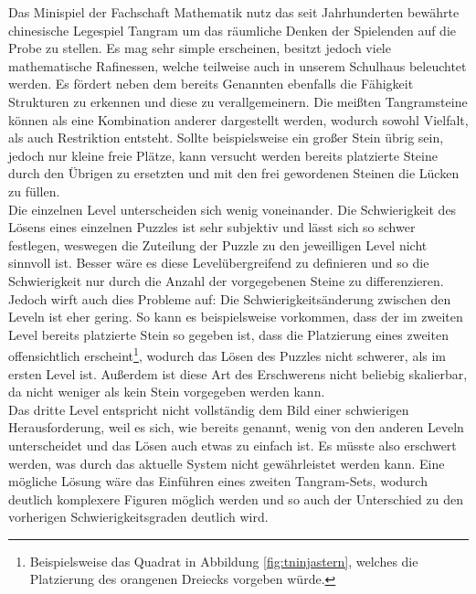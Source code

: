 Das Minispiel der Fachschaft Mathematik nutz das seit Jahrhunderten bewährte chinesische Legespiel \glqq Tangram\grqq{} um das räumliche Denken der Spielenden auf die Probe zu stellen.
Es mag sehr simple erscheinen, besitzt jedoch viele mathematische Rafinessen, welche teilweise auch in unserem Schulhaus beleuchtet werden. 
Es fördert neben dem bereits Genannten ebenfalls die Fähigkeit Strukturen zu erkennen und diese zu verallgemeinern.
Die meißten Tangramsteine können als eine Kombination anderer dargestellt werden, wodurch sowohl Vielfalt, als auch Restriktion entsteht.
Sollte beispielsweise ein großer Stein übrig sein, jedoch nur kleine freie Plätze, kann versucht werden bereits platzierte Steine durch den Übrigen zu ersetzten und mit den frei gewordenen Steinen die Lücken zu füllen.\\
Die einzelnen Level unterscheiden sich wenig voneinander.
Die Schwierigkeit des Lösens eines einzelnen Puzzles ist sehr subjektiv und lässt sich so schwer festlegen, weswegen die Zuteilung der Puzzle zu den jeweilligen Level nicht sinnvoll ist.
Besser wäre es diese Levelübergreifend zu definieren und so die Schwierigkeit nur durch die Anzahl der vorgegebenen Steine zu differenzieren.
Jedoch wirft auch dies Probleme auf:
Die Schwierigkeitsänderung zwischen den Leveln ist eher gering.
So kann es beispielsweise vorkommen, dass der im zweiten Level bereits platzierte Stein so gegeben ist, dass die Platzierung eines zweiten offensichtlich erscheint\footnote{Beispielsweise das Quadrat in Abbildung \ref{fig:tninjastern}, welches die Platzierung des orangenen Dreiecks vorgeben würde.}, wodurch das Lösen des Puzzles nicht schwerer, als im ersten Level ist.
Außerdem ist diese Art des Erschwerens nicht beliebig skalierbar, da nicht weniger als kein Stein vorgegeben werden kann.\\
Das dritte Level entspricht nicht vollständig dem Bild einer schwierigen Herausforderung, weil es sich, wie bereits genannt, wenig von den anderen Leveln unterscheidet und das Lösen auch etwas zu einfach ist.
Es müsste also erschwert werden, was durch das aktuelle System nicht gewährleistet werden kann.
Eine mögliche Lösung wäre das Einführen eines zweiten Tangram-Sets, wodurch deutlich komplexere Figuren möglich werden und so auch der Unterschied zu den vorherigen Schwierigkeitsgraden deutlich wird. 